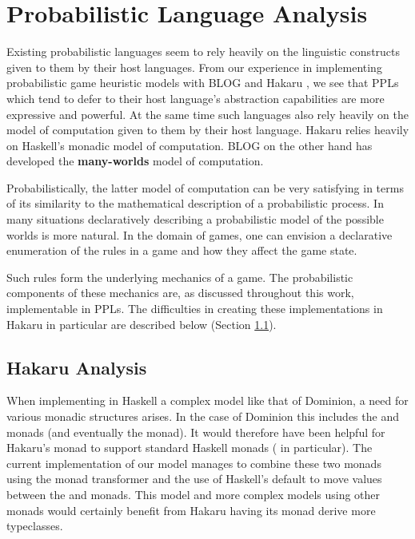 
\section{Probabilistic Language Analysis} \label{sec:meta-analysis}

Existing probabilistic languages seem to rely heavily on the linguistic
constructs given to them by their host languages. From our experience
in implementing probabilistic game heuristic models
with BLOG \cite{BlOG} and Hakaru \cite{hakaru}, we see that PPLs
which tend to defer to their host language's abstraction capabilities are more
expressive and powerful. At the same time such languages also rely
heavily on the model of computation given to them by their host language.
Hakaru relies heavily on Haskell's monadic model of computation. BLOG on
the other hand has developed the {\bf many-worlds} model of computation.

Probabilistically, the latter model of computation can be very satisfying
in terms of its similarity to the mathematical description of a probabilistic
process. In many situations declaratively
describing a probabilistic model of the possible worlds is more natural.
In the domain of games, one can envision a declarative enumeration
of the rules in a game and how they affect the game state.

Such rules form the underlying mechanics of a game. The probabilistic
components of these mechanics are, as discussed throughout this work,
implementable in PPLs. The difficulties in creating these implementations
in Hakaru in particular are described below (Section \ref{sec:hakaru-analysis}).

\subsection{Hakaru Analysis} \label{sec:hakaru-analysis}

When implementing in Haskell a complex model like that of Dominion, a
need for various monadic structures arises. In the case of Dominion
this includes the  and  monads (and eventually
the  monad). It would therefore have been helpful for Hakaru's
 monad to support standard Haskell monads ( in
particular). The current implementation of our model manages to combine
these two monads using the  monad transformer and the use
of Haskell's default  to move values between the  and
 monads. This model and more complex models using other
monads would certainly benefit from Hakaru having its 
monad derive more typeclasses.

